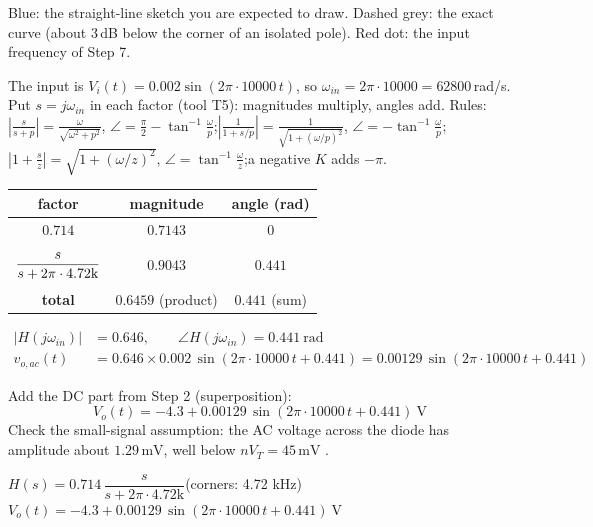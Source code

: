 \documentclass[11pt]{article}
\newcommand{\solstep}[2]{\par\medskip{\color{stepc}\textbf{Step #1 --- #2}}\par\nopagebreak}
\begin{document}
{\small Blue: the straight-line sketch you are expected to draw. Dashed grey: the exact curve (about 3\,dB below the corner of an isolated pole). Red dot: the input frequency of Step 7.}
\solstep{7}{Total output (DC + AC)}The input is $V_i(t) = 0.002\sin\left(2\pi\cdot 10000\,t\right)$, so $\omega_{in} = 2\pi\cdot 10000 = 62800$\,rad/s. Put $s=j\omega_{in}$ in each factor (tool T5): magnitudes multiply, angles add.
{\small Rules: $\left|\frac{s}{s+p}\right| = \frac{\omega}{\sqrt{\omega^2+p^2}}$, $\angle = \frac{\pi}{2}-\tan^{-1}\frac{\omega}{p}$;\quad $\left|\frac{1}{1+s/p}\right| = \frac{1}{\sqrt{1+(\omega/p)^2}}$, $\angle = -\tan^{-1}\frac{\omega}{p}$;\quad $\left|1+\frac{s}{z}\right| = \sqrt{1+(\omega/z)^2}$, $\angle = \tan^{-1}\frac{\omega}{z}$;\quad a negative $K$ adds $-\pi$.}
\begin{center}\renewcommand{\arraystretch}{1.35}
\begin{tabular}{ccc}
\toprule
factor & magnitude & angle (rad) \\
\midrule
$0.714$ & $0.7143$ & $0$ \\
$\rule[-1.1em]{0pt}{2.8em}\dfrac{s}{s+2\pi\cdot 4.72\mathrm{k}}$ & $0.9043$ & $0.441$ \\
\textbf{total} & $\mathbf{0.6459}$ (product) & $\mathbf{0.441}$ (sum) \\
\bottomrule
\end{tabular}\end{center}

\begin{align*}
|H(j\omega_{in})| &= 0.646, \qquad \angle H(j\omega_{in}) = 0.441\ \mathrm{rad} \\
v_{o,ac}(t) &= 0.646\times 0.002\,\sin\left(2\pi\cdot 10000\,t + 0.441\right) = 0.00129\,\sin\left(2\pi\cdot 10000\,t + 0.441\right)
\end{align*}

Add the DC part from Step 2 (superposition):
\[
\boxed{V_o(t) = -4.3 + 0.00129\,\sin\left(2\pi\cdot 10000\,t + 0.441\right)\ \mathrm{V}}
\]
 Check the small-signal assumption: the AC voltage across the diode has amplitude about $1.29\,\mathrm{m}\mathrm{V}$, well below $nV_T = 45\,\mathrm{m}\mathrm{V}$ \checkmark.
\begin{ansbox}
$H(s) = 0.714\,\dfrac{s}{s+2\pi\cdot 4.72\mathrm{k}}$\quad (corners: 4.72 kHz)\\[4pt]
$V_o(t) = -4.3 + 0.00129\,\sin\left(2\pi\cdot 10000\,t + 0.441\right)\ \mathrm{V}$
\end{ansbox}

\newpage
\end{document}
